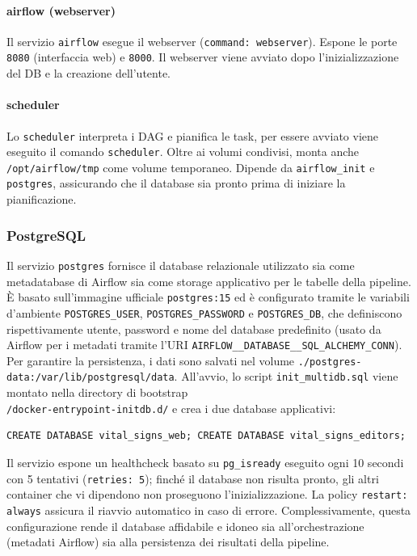 \paragraph{airflow (webserver)}
Il servizio \texttt{airflow} esegue il webserver (\texttt{command: webserver}).
Espone le porte \texttt{8080} (interfaccia web) e \texttt{8000}. Il webserver viene avviato dopo l’inizializzazione del DB e la creazione dell’utente.

\paragraph{scheduler}
Lo \texttt{scheduler} interpreta i DAG e pianifica le task, per essere avviato viene eseguito il comando \texttt{scheduler}.
Oltre ai volumi condivisi, monta anche \texttt{/opt/airflow/tmp} come volume temporaneo.  
Dipende da \texttt{airflow\_init} e \texttt{postgres}, assicurando che il database sia pronto prima di iniziare la pianificazione.

\subsubsection{PostgreSQL}
Il servizio \texttt{postgres} fornisce il database relazionale utilizzato sia come metadatabase di Airflow sia come storage applicativo per le tabelle della pipeline. È basato sull’immagine ufficiale \texttt{postgres:15} ed è configurato tramite le variabili d’ambiente \texttt{POSTGRES\_USER}, \texttt{POSTGRES\_PASSWORD} e \texttt{POSTGRES\_DB}, che definiscono rispettivamente utente, password e nome del database predefinito (usato da Airflow per i metadati tramite l’URI \texttt{AIRFLOW\_\_DATABASE\_\_SQL\_ALCHEMY\_CONN}).\\
Per garantire la persistenza, i dati sono salvati nel volume \texttt{./postgres-data:/var/lib/postgresql/data}. All'avvio, lo script \texttt{init\_multidb.sql} viene montato nella directory di bootstrap\\ \texttt{/docker-entrypoint-initdb.d/} e crea i due database applicativi:
\begin{verbatim}
CREATE DATABASE vital_signs_web; CREATE DATABASE vital_signs_editors;
\end{verbatim}

Il servizio espone un healthcheck basato su \texttt{pg\_isready} eseguito ogni 10 secondi con 5 tentativi (\texttt{retries: 5}); finché il database non risulta pronto, gli altri container che vi dipendono non proseguono l’inizializzazione. La policy \texttt{restart: always} assicura il riavvio automatico in caso di errore. Complessivamente, questa configurazione rende il database affidabile e idoneo sia all’orchestrazione (metadati Airflow) sia alla persistenza dei risultati della pipeline.


